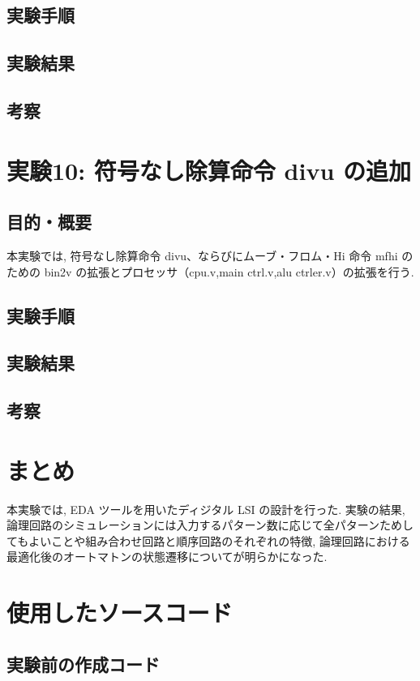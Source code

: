 \documentclass[epsf,a4paper,dvipdfmx,autodetect-engine,titlepage]{jsarticle}
\begin{document}
\subsection{実験手順}
\subsection{実験結果}
\subsection{考察}

\section{実験10: 符号なし除算命令 divu の追加}
\subsection{目的・概要}
本実験では, 符号なし除算命令 divu、ならびにムーブ・フロム・Hi 命令 mfhi のための bin2v
の拡張とプロセッサ（cpu.v,main ctrl.v,alu ctrler.v）の拡張を行う.
\subsection{実験手順}
\subsection{実験結果}
\subsection{考察}


\section{まとめ}
本実験では, EDA ツールを用いたディジタル LSI の設計を行った. 実験の結果,論理回路のシミュレーションには入力するパターン数に応じて全パターンためしてもよいことや組み合わせ回路と順序回路のそれぞれの特徴, 論理回路における最適化後のオートマトンの状態遷移についてが明らかになった. 

\section{使用したソースコード}
\subsection{実験前の作成コード}




\end{document}
